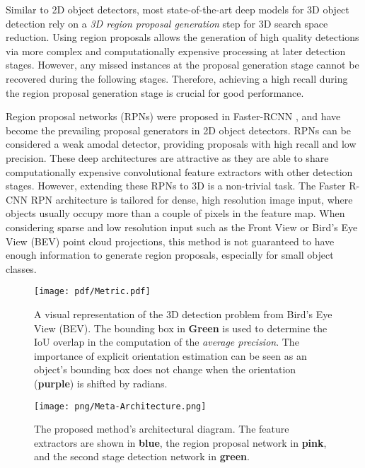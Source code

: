 \documentclass[letterpaper, 10 pt, conference]{ieeeconf}
\begin{document}
Similar to 2D object detectors, most state-of-the-art deep models for 3D object detection rely on a \textit{3D region proposal generation} step for 3D search space reduction. Using region proposals allows the generation of high quality detections via more complex and computationally expensive processing at later detection stages. However, any missed instances at the proposal generation stage cannot be recovered during the following stages. Therefore, achieving a high recall during the region proposal generation stage is crucial for good performance.

Region proposal networks (RPNs) were proposed in Faster-RCNN \cite{ren2015faster}, and have become the prevailing proposal generators in 2D object detectors. RPNs can be considered a weak amodal detector, providing proposals with high recall and low precision. These deep architectures are attractive as they are able to share computationally expensive convolutional feature extractors with other detection stages. However, extending these RPNs to 3D is a non-trivial task. The Faster R-CNN RPN architecture is tailored for dense, high resolution image input, where objects usually occupy more than a couple of pixels in the feature map. When considering sparse and low resolution input such as the Front View \cite{Li-RSS-16} or Bird's Eye View (BEV) \cite{cvpr17chen} point cloud projections, this method is not guaranteed to have enough information to generate region proposals, especially for small object classes.

\begin{figure}[t] 
\begin{center}
\texttt{[image: pdf/Metric.pdf]}
\end{center}
\caption{A visual representation of the 3D detection problem from Bird's Eye View (BEV). The bounding box in \textbf{Green} is used to determine the IoU overlap in the computation of the \textit{average precision}. The importance of explicit orientation estimation can be seen as an object's bounding box does not change when the orientation (\textbf{purple}) is shifted by  radians.}
\label{metric}
\end{figure}

\begin{figure*}[t] 
\begin{center}
\texttt{[image: png/Meta-Architecture.png]}
\end{center}
\caption{The proposed method's architectural diagram. The feature extractors are shown in \textbf{blue}, the region proposal network in \textbf{pink}, and the second stage detection network in \textbf{green}.}
\label{metarch}
\end{figure*}
\end{document}
